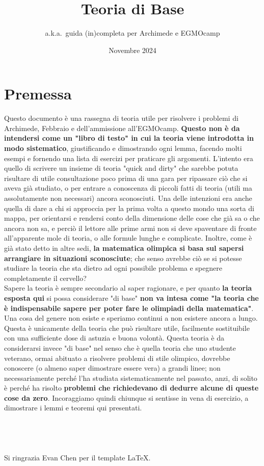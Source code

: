 \documentclass[11pt]{scrartcl}
\begin{document}
	\title{Teoria di Base}
	\subtitle{a.k.a.\ guida (in)completa per Archimede e EGMOcamp}
	\date{Novembre 2024}

	
	\maketitle
	\section*{Premessa}
	Questo documento è una rassegna di teoria utile per risolvere i problemi di Archimede, Febbraio e dell'ammissione all'EGMOcamp. \textbf{Questo non è da intendersi come un "libro di testo" in cui la teoria viene introdotta in modo sistematico}, giustificando e dimostrando ogni lemma, facendo molti esempi e fornendo una lista di esercizi per praticare gli argomenti. L'intento era quello di scrivere un insieme di teoria "quick and dirty" che sarebbe potuta risultare di utile consultazione poco prima di una gara per ripassare ciò che si aveva già studiato, o per entrare a conoscenza di piccoli fatti di teoria (utili ma assolutamente non necessari) ancora sconosciuti. Una delle intenzioni era anche quella di dare a chi si approccia per la prima volta a questo mondo una sorta di mappa, per orientarsi e rendersi conto della dimensione delle cose che già sa o che ancora non sa, e perciò il lettore alle prime armi non si deve spaventare di fronte all'apparente mole di teoria, o alle formule lunghe e complicate. Inoltre, come è già stato detto in altre sedi, \textbf{la matematica olimpica si basa sul sapersi arrangiare in situazioni sconosciute}; che senso avrebbe ciò se si potesse studiare la teoria che sta dietro ad ogni possibile problema e spegnere completamente il cervello? \\
	Sapere la teoria è sempre secondario al saper ragionare, e per quanto \textbf{la teoria esposta qui} si possa considerare "di base" \textbf{non va intesa come "la teoria che è indispensabile sapere per poter fare le olimpiadi della matematica"}. Una cosa del genere non esiste e speriamo continui a non esistere ancora a lungo. Questa è unicamente della teoria che può risultare utile, facilmente sostituibile con una sufficiente dose di astuzia e buona volontà. Questa teoria è da considerarsi invece "di base" nel senso che è quella teoria che uno studente veterano, ormai abituato a risolvere problemi di stile olimpico, dovrebbe conoscere (o almeno saper dimostrare essere vera) a grandi linee; non necessariamente perché l'ha studiata sistematicamente nel passato, anzi, di solito è perché ha risolto \textbf{problemi che richiedevano di dedurre alcune di queste cose da zero}. Incoraggiamo quindi chiunque si sentisse in vena di esercizio, a dimostrare i lemmi e teoremi qui presentati. \\
	\\
	\\
	\\
	\\
	Si ringrazia Evan Chen per il template \LaTeX.
	\newpage
	\tableofcontents
	\newpage
\end{document}
